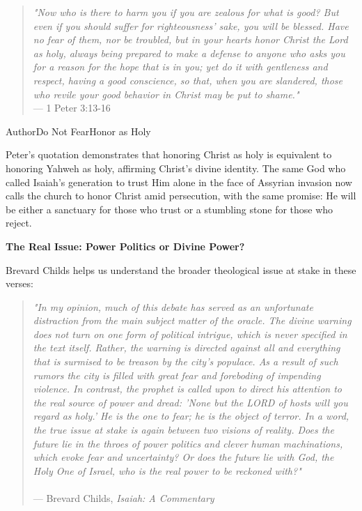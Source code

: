 \documentclass[11pt]{article}
\begin{document}
\begin{quote}
\textit{"Now who is there to harm you if you are zealous for what is good? But even if you should suffer for righteousness' sake, you will be blessed. Have no fear of them, nor be troubled, but in your hearts honor Christ the Lord as holy, always being prepared to make a defense to anyone who asks you for a reason for the hope that is in you; yet do it with gentleness and respect, having a good conscience, so that, when you are slandered, those who revile your good behavior in Christ may be put to shame."}\\
\hfill --- 1 Peter 3:13-16
\end{quote}

\vspace{1em}

\begin{comparisontable}{Author}{Do Not Fear}{Honor as Holy}




\end{comparisontable}

\vspace{1em}
Peter's quotation demonstrates that honoring Christ as holy is equivalent to honoring Yahweh as holy, affirming Christ's divine identity. The same God who called Isaiah's generation to trust Him alone in the face of Assyrian invasion now calls the church to honor Christ amid persecution, with the same promise: He will be either a sanctuary for those who trust or a stumbling stone for those who reject.

\vspace{3em}
{\large\bfseries The Real Issue: Power Politics or Divine Power?}
\vspace{1em}

Brevard Childs helps us understand the broader theological issue at stake in these verses:

\begin{quote}
\textit{"In my opinion, much of this debate has served as an unfortunate distraction from the main subject matter of the oracle. The divine warning does not turn on one form of political intrigue, which is never specified in the text itself. Rather, the warning is directed against all and everything that is surmised to be treason by the city's populace. As a result of such rumors the city is filled with great fear and foreboding of impending violence. In contrast, the prophet is called upon to direct his attention to the real source of power and dread: 'None but the LORD of hosts will you regard as holy.' He is the one to fear; he is the object of terror. In a word, the true issue at stake is again between two visions of reality. Does the future lie in the throes of power politics and clever human machinations, which evoke fear and uncertainty? Or does the future lie with God, the Holy One of Israel, who is the real power to be reckoned with?"}\\\\
\hfill --- Brevard Childs, \textit{Isaiah: A Commentary}
\end{quote}
\end{document}

